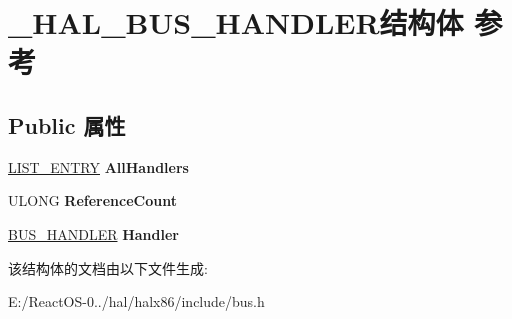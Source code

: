 \hypertarget{struct___h_a_l___b_u_s___h_a_n_d_l_e_r}{}\section{\+\_\+\+H\+A\+L\+\_\+\+B\+U\+S\+\_\+\+H\+A\+N\+D\+L\+E\+R结构体 参考}
\label{struct___h_a_l___b_u_s___h_a_n_d_l_e_r}
\subsection*{Public 属性}
\begin{DoxyCompactItemize}
\item 
\mbox{\label{struct___h_a_l___b_u_s___h_a_n_d_l_e_r_a971da2d6cec8bded00186e828283f1ad}} 
\hyperlink{struct___l_i_s_t___e_n_t_r_y}{L\+I\+S\+T\+\_\+\+E\+N\+T\+RY} {\bfseries All\+Handlers}
\item 
\mbox{\label{struct___h_a_l___b_u_s___h_a_n_d_l_e_r_a8f3bacd2233f1c37d3cda8b478970ac4}} 
U\+L\+O\+NG {\bfseries Reference\+Count}
\item 
\mbox{\label{struct___h_a_l___b_u_s___h_a_n_d_l_e_r_a5afff45f817c49d4122c65ec02fcaa80}} 
\hyperlink{struct___b_u_s___h_a_n_d_l_e_r}{B\+U\+S\+\_\+\+H\+A\+N\+D\+L\+ER} {\bfseries Handler}
\end{DoxyCompactItemize}


该结构体的文档由以下文件生成\+:\begin{DoxyCompactItemize}
\item 
E\+:/\+React\+O\+S-\/0../hal/halx86/include/bus.\+h\end{DoxyCompactItemize}
